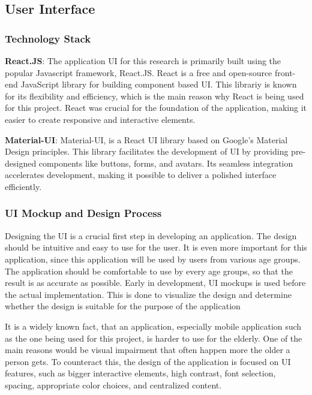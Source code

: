 \subsection{User Interface}

\subsubsection{Technology Stack}

\textbf{React.JS}: The application \ac{UI} for this research is primarily built using the popular Javascript framework, React.JS.
React is a free and open-source front-end JavaScript library for building component based \ac{UI}.
This librariy is known for its flexibility and efficiency, which is the main reason why React is being used for this project.
React was crucial for the foundation of the application, making it easier to create responsive and interactive elements.  

\textbf{ Material-UI}: Material-UI, is a React UI library based on Google’s Material Design principles.
This library facilitates the development of \ac{UI} by providing pre-designed components like buttons, forms, and avatars. 
Its seamless integration accelerates development, making it possible  to deliver a polished interface efficiently.

\subsubsection{UI Mockup and Design Process}

Designing the \ac{UI} is a crucial first step in developing an application.
The design should be intuitive and easy to use for the user.
It is even more important for this application, since this application will be used by users from various age groups.
The application should be comfortable to use by every age groups, so that the result is as accurate as possible.
Early in development, \ac{UI} mockups is used before the actual implementation.
This is done to visualize the design and determine whether the design is suitable for the purpose of the application

It is a widely known fact, that an application, especially mobile application such as the one being used for this project, is harder to use for the elderly.
One of the main reasons would be visual impairment that often happen more the older a person gets.
To counteract this, the design of the application is focused on \ac{UI} features, such as bigger interactive elements, high contrast, font selection, spacing, appropriate color choices, and  centralized content.

